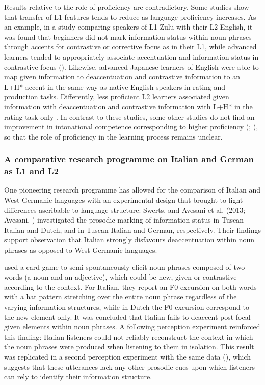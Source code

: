 Results relative to the role of proficiency are contradictory. Some studies show that transfer of L1 features tends to reduce as language proficiency increases. As an example, in a study comparing speakers of L1 Zulu with their L2 English, it was found that beginners did not mark information status within noun phrases through accents for contrastive or corrective focus as in their L1, while advanced learners tended to appropriately associate accentuation and information status in contrastive focus (\citealt{SwertsZerbian2010}). Likewise, advanced Japanese learners of English were able to map given information to deaccentuation and contrastive information to an L+H* accent in the same way as native English speakers in rating and production tasks. Differently, less proficient L2 learners associated given information with deaccentuation and contrastive information with L+H* in the rating task only \citep{Takeda2018}. In contrast to these studies, some other studies do not find an improvement in intonational competence corresponding to higher proficiency (\citealt{Bi2008}; \citealt{Verdugo2003}), so that the role of proficiency in the learning process remains unclear.

\subsubsection{A comparative research programme on Italian and German as L1 and L2}
\hypertarget{Toc191305890}{}
One pioneering research programme has allowed for the comparison of Italian and West-Germanic languages with an experimental design that brought to light differences ascribable to language structure: Swerts, \citet{KrahmerAvesani2002} and Avesani et al. (2013; Avesani, \citealt{BocciVayra2015}) investigated the prosodic marking of information status in Tuscan Italian and Dutch, and in Tuscan Italian and German, respectively. Their findings support  observation that Italian strongly disfavours deaccentuation within noun phrases as opposed to West-Germanic languages.

\citet{SwertsEtAl2002} used a card game to semi-spontaneously elicit noun phrases composed of two words (a noun and an adjective), which could be new, given or contrastive according to the context. For Italian, they report an F0 excursion on both words with a hat pattern stretching over the entire noun phrase regardless of the varying information structures, while in Dutch the F0 excursion correspond to the new element only. It was concluded that Italian fails to deaccent post-focal given elements within noun phrases. A following perception experiment reinforced this finding: Italian listeners could not reliably reconstruct the context in which the noun phrases were produced when listening to them in isolation. This result was replicated in a second perception experiment with the same data (\citealt{KrahmerSwerts2008}), which suggests that these utterances lack any other prosodic cues upon which listeners can rely to identify their information structure.


